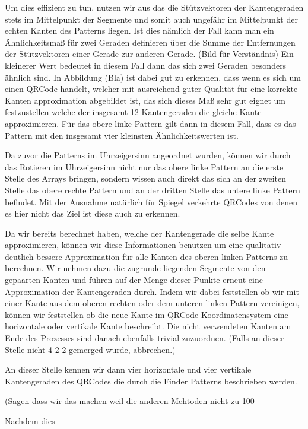 Um dies effizient zu tun, nutzen wir aus das die Stützvektoren der Kantengeraden stets im  Mittelpunkt der Segmente und somit auch ungefähr im Mittelpunkt der echten Kanten des Patterns liegen. Ist dies nämlich der Fall kann man ein Ähnlichkeitsmaß für zwei Geraden definieren über die Summe der Entfernungen der Stützvektoren einer Gerade zur anderen Gerade. (Bild für Verständnis) Ein kleinerer Wert bedeutet in diesem Fall dann das sich zwei Geraden besonders ähnlich sind. In Abbildung (Bla) ist dabei gut zu erkennen, dass wenn es sich um einen QRCode handelt, welcher mit ausreichend guter Qualität für eine korrekte Kanten approximation abgebildet ist, das sich dieses Maß sehr gut eignet um festzustellen welche der insgesamt 12 Kantengeraden die gleiche Kante approximieren. Für das obere linke Pattern gilt dann in diesem Fall, dass es das Pattern mit den insgesamt vier kleinsten Ähnlichkeitswerten ist.

Da zuvor die Patterns im Uhrzeigersinn angeordnet wurden, können wir durch das Rotieren im Uhrzeigersinn nicht nur das obere linke Pattern an die erste Stelle des Arrays bringen, sondern wissen auch direkt das sich an der zweiten Stelle das obere rechte Pattern und an der dritten Stelle das untere linke Pattern befindet. Mit der Ausnahme natürlich für Spiegel verkehrte QRCodes von denen es hier nicht das Ziel ist diese auch zu erkennen.

Da wir bereits berechnet haben, welche der Kantengerade die selbe Kante approximieren, können wir diese Informationen benutzen um eine qualitativ deutlich bessere Approximation für alle Kanten des oberen linken Patterns zu berechnen. Wir nehmen dazu die zugrunde liegenden Segmente von den gepaarten Kanten und führen auf der Menge dieser Punkte erneut eine Approximation der Kantengeraden durch. Indem wir dabei feststellen ob wir mit einer Kante aus dem oberen rechten oder dem unteren linken Pattern vereinigen, können wir feststellen ob die neue Kante im QRCode Koordinatensystem eine horizontale oder vertikale Kante beschreibt. Die nicht verwendeten Kanten am Ende des Prozesses sind danach ebenfalls trivial zuzuordnen. (Falls an dieser Stelle nicht 4-2-2 gemerged wurde, abbrechen.)

An dieser Stelle kennen wir dann vier horizontale und vier vertikale Kantengeraden des QRCodes die durch die Finder Patterns beschrieben werden.

(Sagen dass wir das machen weil die anderen Mehtoden nicht zu 100%

Nachdem dies